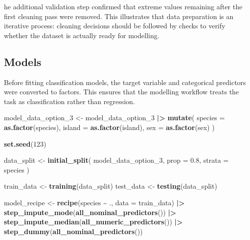 \documentclass[
]{article}
\newenvironment{Shaded}{\begin{snugshade}}{\end{snugshade}}
\newcommand{\AttributeTok}[1]{\textcolor[rgb]{0.13,0.29,0.53}{#1}}
\newcommand{\DecValTok}[1]{\textcolor[rgb]{0.00,0.00,0.81}{#1}}
\newcommand{\FloatTok}[1]{\textcolor[rgb]{0.00,0.00,0.81}{#1}}
\newcommand{\FunctionTok}[1]{\textcolor[rgb]{0.13,0.29,0.53}{\textbf{#1}}}
\newcommand{\NormalTok}[1]{#1}
\newcommand{\OtherTok}[1]{\textcolor[rgb]{0.56,0.35,0.01}{#1}}
\newcommand{\SpecialCharTok}[1]{\textcolor[rgb]{0.81,0.36,0.00}{\textbf{#1}}}
\begin{document}
he additional validation step confirmed that extreme values remaining
after the first cleaning pass were removed. This illustrates that data
preparation is an iterative process: cleaning decisions should be
followed by checks to verify whether the dataset is actually ready for
modelling.

\subsection{Models}\label{models}

Before fitting classification models, the target variable and
categorical predictors were converted to factors. This ensures that the
modelling workflow treats the task as classification rather than
regression.

\begin{Shaded}
\begin{Highlighting}[]
\NormalTok{model\_data\_option\_3 }\OtherTok{\textless{}{-}}\NormalTok{ model\_data\_option\_3 }\SpecialCharTok{|\textgreater{}}
  \FunctionTok{mutate}\NormalTok{(}
    \AttributeTok{species =} \FunctionTok{as.factor}\NormalTok{(species),}
    \AttributeTok{island =} \FunctionTok{as.factor}\NormalTok{(island),}
    \AttributeTok{sex =} \FunctionTok{as.factor}\NormalTok{(sex)}
\NormalTok{  )}
\end{Highlighting}
\end{Shaded}

\begin{Shaded}
\begin{Highlighting}[]
\FunctionTok{set.seed}\NormalTok{(}\DecValTok{123}\NormalTok{)}

\NormalTok{data\_split }\OtherTok{\textless{}{-}} \FunctionTok{initial\_split}\NormalTok{(}
\NormalTok{  model\_data\_option\_3,}
  \AttributeTok{prop =} \FloatTok{0.8}\NormalTok{,}
  \AttributeTok{strata =}\NormalTok{ species}
\NormalTok{)}

\NormalTok{train\_data }\OtherTok{\textless{}{-}} \FunctionTok{training}\NormalTok{(data\_split)}
\NormalTok{test\_data  }\OtherTok{\textless{}{-}} \FunctionTok{testing}\NormalTok{(data\_split)}
\end{Highlighting}
\end{Shaded}

\begin{Shaded}
\begin{Highlighting}[]
\NormalTok{model\_recipe }\OtherTok{\textless{}{-}} \FunctionTok{recipe}\NormalTok{(species }\SpecialCharTok{\textasciitilde{}}\NormalTok{ ., }\AttributeTok{data =}\NormalTok{ train\_data) }\SpecialCharTok{|\textgreater{}}
  \FunctionTok{step\_impute\_mode}\NormalTok{(}\FunctionTok{all\_nominal\_predictors}\NormalTok{()) }\SpecialCharTok{|\textgreater{}}
  \FunctionTok{step\_impute\_median}\NormalTok{(}\FunctionTok{all\_numeric\_predictors}\NormalTok{()) }\SpecialCharTok{|\textgreater{}}
  \FunctionTok{step\_dummy}\NormalTok{(}\FunctionTok{all\_nominal\_predictors}\NormalTok{())}
\end{Highlighting}
\end{Shaded}
\end{document}
